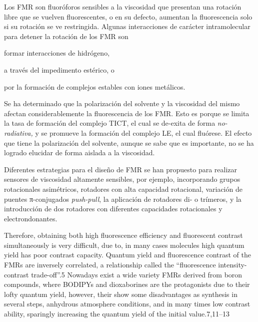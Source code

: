 \documentclass[spanish,mexico]{scrartcl}
\begin{document}
Los \gls{FMR} son fluoróforos sensibles a la viscosidad que presentan una rotación libre que se vuelven fluorescentes, o en su defecto, aumentan la fluorescencia solo si su rotación se ve restringida. Algunas interacciones de carácter intramolecular para detener la rotación de los \gls{FMR} son \begin{inparaenum}[i.]
    \item formar interacciones de hidrógeno,\autocite{wuMultistageRotationalSpeed2018}
    \item a través del impedimento estérico,\autocite{faulknerAllostericRegulationRotational2016} o
    \item por la formación de complejos estables con iones metálicos.\autocite{yadavViscochromicMechanochromicUnsymmetrical2019}
\end{inparaenum}

Se ha determinado que la polarización del solvente y la viscosidad del mismo afectan considerablemente la fluorescencia de los \gls{FMR}. Esto es porque se limita la tasa de formación del complejo \gls{TICT}, el cual se de-exita de forma \emph{no-radiativa,} y se promueve la formación del complejo \gls{LE}, el cual fluórese. El efecto que tiene la polarización del solvente, aunque se sabe que es importante, no se ha logrado elucidar de forma aislada a la viscosidad.\cite{haidekkerEffectsSolventPolarity2005}

Diferentes estrategias para el diseño de \gls{FMR} se han propuesto para realizar sensores de viscosidad altamente sensibles, por ejemplo, incorporando grupos rotacionales asimétricos,\autocite{leePyrrolicMolecularRotors2016} rotadores con alta capacidad rotacional,\autocite{karpenkoPushPullDioxaborine2016} variación de puentes π-conjugados \emph{push-pull},\autocite{karpenkoPushPullDioxaborine2016} la aplicación de rotadores di- o trímeros,\autocite{kimballBODIPYBODIPYDyad2015} y la introducción de dos rotadores con diferentes capacidades rotacionales y electrondonantes.\autocite{rautTriazinebasedBODIPYTrimer2016}

Therefore, obtaining both high fluorescence efficiency and fluorescent contrast simultaneously is very difficult, due to, in many cases molecules high quantum yield has poor contrast capacity. Quantum yield and fluorescence contrast of the FMRs are inversely correlated, a relationship called the “fluorescence intensity-contrast trade-off”.5 Nowadays exist a wide variety FMRs derived from boron compounds, where BODIPYs and dioxaborines are the protagonists due to their lofty quantum yield, however, their show some disadvantages as synthesis in several steps, anhydrous atmosphere conditions, and in many times low contrast ability, sparingly increasing the quantum yield of the initial value.7,11–13
\end{document}
